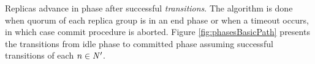 Replicas advance in phase after successful \emph{transitions}. The algorithm is done when quorum of each replica group is in an end phase or when a timeout occurs, in which case commit procedure is aborted. Figure \ref{fig:phasesBasicPath} presents the transitions from idle phase to committed phase assuming successful transitions of each $n\in \text{$\mathit{N'}$}$.



\newcommand{\setupTransition}{$\mathit{setup\_transition()}$\xspace}
\newcommand{\prepareTransition}{$\mathit{prepare\_transition()}$\xspace}
\newcommand{\proposeTransition}{$\mathit{propose\_transition()}$\xspace}
\newcommand{\commitTransition}{$\mathit{commit\_transition()}$\xspace}
\newcommand{\repairingTransition}{$\mathit{reparing\_transition()}$\xspace}



